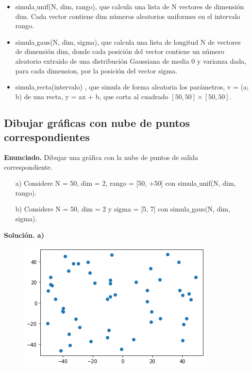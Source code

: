 \documentclass[a4paper,11pt]{article}
\begin{document}
\begin{itemize}
\item simula$\_$unif(N, dim, rango), que calcula una lista de N vectores de dimensión dim. Cada vector contiene dim números aleatorios uniformes en el intervalo rango.
\item simula$\_$gaus(N, dim, sigma), que calcula una lista de longitud N de vectores de dimensión dim, donde cada posición del vector contiene un número aleatorio extraido de una distribución Gaussiana de media 0 y varianza dada, para cada dimension, por la posición del vector sigma.
\item simula$\_$recta(intervalo) , que simula de forma aleatoria los parámetros, v = (a; b) de una recta, y = ax + b, que corta al cuadrado $[50, 50] \times [50, 50]$.
\end{itemize}


\subsection{Dibujar gráficas con nube de puntos correspondientes}

\textbf{Enunciado.} Dibujar una gráfica con la nube de puntos de salida correspondiente.
\begin{enumerate}
\item[a)] Considere N = 50, dim = 2, rango = [50, +50] con simula$\_$unif(N, dim, rango).
\item[b)] Considere N = 50, dim = 2 y sigma = [5, 7] con simula$\_$gaus(N, dim, sigma).
\end{enumerate}

\textbf{Solución. a)} 

\begin{figure}[h]
\includegraphics[scale=0.7]{ej1a}
\centering
\end{figure}

\newpage
\end{document}
